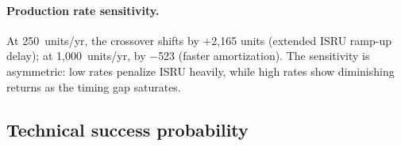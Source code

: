 \documentclass[5p,twocolumn]{elsarticle}
\begin{document}
\begin{table}[htbp]
\centering
\caption{Savings window survival: probability that a program of $N_h$ units falls within the ISRU savings window $[N^*, N^{**}]$ (all converging MC runs, $r = 5\%$). For permanent crossovers, $N^{**} = 200{,}000$ (effectively infinite). Bootstrap 95\% CIs from 5{,}000 resamples of converging runs.}
\label{tab:savings_survival}
\small
{}
\end{table}

\paragraph{Production rate sensitivity.} At 250~units/yr, the crossover shifts by $+$2{,}165 units (extended ISRU ramp-up delay); at 1{,}000~units/yr, by $-$523 (faster amortization). The sensitivity is asymmetric: low rates penalize ISRU heavily, while high rates show diminishing returns as the timing gap saturates.

\subsection{Technical success probability}
\label{sec:success_probability}
\end{document}
